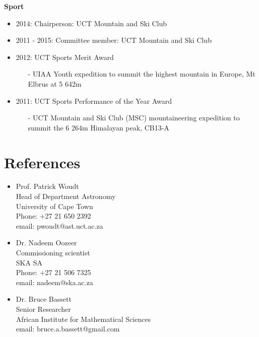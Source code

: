 \documentclass{article}
\begin{document}
\large\textbf{Sport}
\vspace{0.2cm}
\normalsize
\begin{itemize}
  \item 2014: Chairperson: UCT Mountain and Ski Club
  \item 2011 - 2015: Committee member: UCT Mountain and Ski Club
  \item 2012: UCT Sports Merit Award
  \begin{itemize}
      \item[-] UIAA Youth expedition to summit the highest mountain in Europe, Mt Elbrus at 5 642m
  \end{itemize}
  \item 2011: UCT Sports Performance of the Year Award
  \begin{itemize}
      \item[-] UCT Mountain and Ski Club (MSC) mountaineering expedition to summit the 6 264m Himalayan peak, CB13-A	
  \end{itemize}
 
\end{itemize}


\section*{References}
\begin{itemize}

 \item Prof. Patrick Woudt\\Head of Department Astronomy\\ University of Cape Town\\Phone: +27 21 650 2392\\email: pwoudt@ast.uct.ac.za
 \item Dr. Nadeem Oozeer\\Commissioning scientist\\SKA SA\\Phone: +27 21 506 7325\\email: nadeem@ska.ac.za
 \item Dr. Bruce Bassett\\Senior Researcher\\African Institute for Mathematical Sciences\\email: bruce.a.bassett@gmail.com
 
 
\end{itemize}
\end{document}
